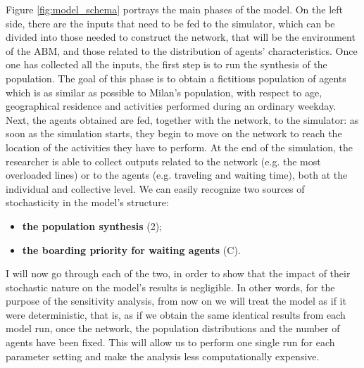 Figure \ref{fig:model_schema} portrays the main phases of the model. On the left side, there are the inputs that need to be fed to the simulator, which can be divided into those needed to construct the network, that will be the environment of the ABM, and those related to the distribution of agents' characteristics. Once one has collected all the inputs, the first step is to run the synthesis of the population. The goal of this phase is to obtain a fictitious population of agents which is as similar as possible to Milan's population, with respect to age, geographical residence and activities performed during an ordinary weekday. Next, the agents obtained are fed, together with the network, to the simulator: as soon as the simulation starts, they begin to move on the network to reach the location of the activities they have to perform. At the end of the simulation, the researcher is able to collect outputs related to the network (e.g. the most overloaded lines) or to the agents (e.g. traveling and waiting time), both at the individual and collective level. 
We can easily recognize two sources of stochasticity in the model's structure:
\begin{itemize}
	\item \textbf{the population synthesis} (2);
	\item \textbf{the boarding priority for waiting agents} (C). 
\end{itemize}
I will now go through each of the two, in order to show that the impact of their stochastic nature on the model's results is negligible. In other words, for the purpose of the sensitivity analysis, from now on we will treat the model as if it were deterministic, that is, as if we obtain the same identical results from each model run, once the network, the population distributions and the number of agents have been fixed. This will allow us to perform one single run for each parameter setting and make the analysis less computationally expensive.

